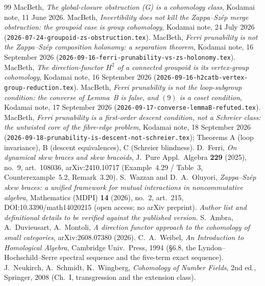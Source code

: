 \documentclass[11pt]{article}
\theoremstyle{definition}
\begin{document}
\begin{thebibliography}{99}
 MacBeth, \emph{The global-closure obstruction (G) is a cohomology class},
Kodamai note, 11 June 2026.
 MacBeth, \emph{Invertibility does not kill the Zappa--Sz\'ep merge obstruction:
the groupoid case is group cohomology}, Kodamai note, 24 July 2026
(\texttt{2026-07-24-groupoid-zs-obstruction.tex}).
 MacBeth, \emph{Ferri prunability is not the Zappa--Sz\'ep composition holonomy:
a separation theorem}, Kodamai note, 16 September 2026
(\texttt{2026-09-16-ferri-prunability-vs-zs-holonomy.tex}).
 MacBeth, \emph{The direction-functor $H^2$ of a connected groupoid is its
vertex-group cohomology}, Kodamai note, 16 September 2026
(\texttt{2026-09-16-h2catb-vertex-group-reduction.tex}).
 MacBeth, \emph{Ferri prunability is not the loop-subgroup condition: the
converse of Lemma~B is false, and $(9)$ is a coset condition}, Kodamai note, 17 September 2026
(\texttt{2026-09-17-converse-lemmaB-refuted.tex}).
 MacBeth, \emph{Ferri prunability is a first-order descent condition, not a
Schreier class: the untwisted core of the fibre-edge problem}, Kodamai note, 18 September 2026
(\texttt{2026-09-18-prunability-is-descent-not-schreier.tex}); Theorems A (loop invariance), B
(descent equivalences), C (Schreier blindness).
 D.~Ferri, \emph{On dynamical skew braces and skew bracoids}, J.\ Pure Appl.\
Algebra \textbf{229} (2025), no.~9, art.~108036, arXiv:2410.10717
(Example~4.29 / Table~3, Counterexample~5.2, Remark~3.20).
 S.~Wazzan and D.~A.~Oluyori, \emph{Zappa--Sz\'ep skew braces: a unified
framework for mutual interactions in noncommutative algebra}, Mathematics (MDPI)
\textbf{14} (2026), no.~2, art.~215, DOI:10.3390/math14020215 (open access; no arXiv
preprint). \emph{Author list and definitional details to be verified against the published
version.}
 S.~Ambra, A.~Duvieusart, A.~Montoli, \emph{A direction functor approach to the
cohomology of small categories}, arXiv:2608.07380 (2026).
 C.~A.~Weibel, \emph{An Introduction to Homological Algebra}, Cambridge Univ.\
Press, 1994 (\S6.8, the Lyndon--Hochschild--Serre spectral sequence and the five-term exact
sequence).
\bibitem{nsw} J.~Neukirch, A.~Schmidt, K.~Wingberg, \emph{Cohomology of Number Fields}, 2nd
ed., Springer, 2008 (Ch.~I, transgression and the extension class).
\end{thebibliography}
\end{document}
